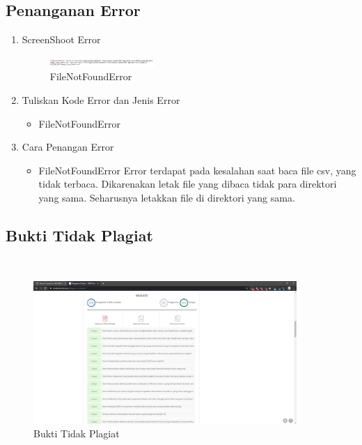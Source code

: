 \subsection{Penanganan Error}
\begin{enumerate}
	\item ScreenShoot Error
	\begin{figure}[H]
		\includegraphics[width=4cm]{figures/1174074/3/error1.jpg}
		\centering
		\caption{FileNotFoundError}
	\end{figure}
	\item Tuliskan Kode Error dan Jenis Error
	\begin{itemize}
		\item FileNotFoundError
	\end{itemize}
	\item Cara Penangan Error
	\begin{itemize}
		\item FileNotFoundError
		\hfill\break
		Error terdapat pada kesalahan saat baca file csv, yang tidak terbaca. Dikarenakan letak file yang dibaca tidak para direktori yang sama. Seharusnya letakkan file di direktori yang sama. 
	\end{itemize}
\end{enumerate}


\subsection{Bukti Tidak Plagiat}
\hfill\\
\begin{figure}[H]
\centerline{\includegraphics[width=10cm]{figures/1174074/3/plagiat.jpg}}
\caption{Bukti Tidak Plagiat}
\label{labelgambar}
\end{figure}

